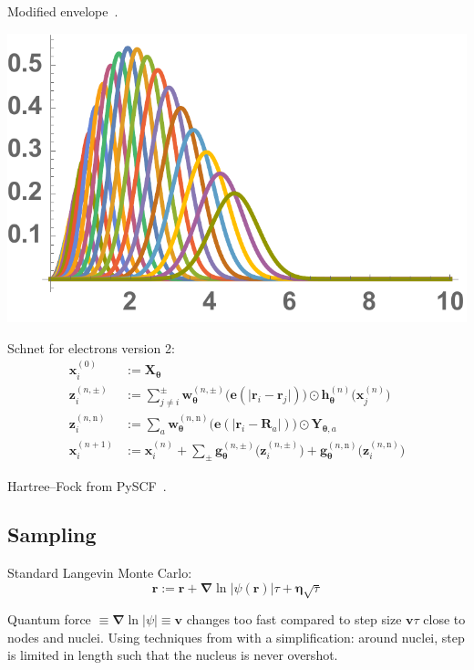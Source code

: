Modified envelope~\citep{UnkeAP19}.

\begin{center}
\includegraphics[width=0.6\linewidth]{figs/dist-features.pdf}
\end{center}

Schnet for electrons version 2:
\begin{equation}
\begin{aligned}
\mathbf x_i^{(0)}&:=\mathbf X_{\boldsymbol\theta} \\
\mathbf z_i^{(n,\pm)}&:=\sum\nolimits_{j\neq i}^\pm
  \mathbf w^{(n,\pm)}_{\boldsymbol\theta}
  \big(\mathbf e(\lvert\mathbf r_i-\mathbf r_j\rvert)\big)
  \odot\mathbf h_{\boldsymbol\theta}^{(n)}\big(\mathbf x_j^{(n)}\big) \\ 
\mathbf z_i^{(n,\mathrm n)}&:=\sum\nolimits_a
  \mathbf w_{\boldsymbol\theta}^{(n,\mathrm n)}
  \big(\mathbf e(\lvert\mathbf r_i-\mathbf R_a\rvert)\big)
  \odot\mathbf Y_{\boldsymbol\theta,a} \\
\mathbf x_i^{(n+1)}&:=\mathbf x_i^{(n)}
  +\sum\nolimits_\pm\mathbf g^{(n,\pm)}_{\boldsymbol\theta}
  \big(\mathbf z_i^{(n,\pm)}\big)
  +\mathbf g^{(n,\mathrm n)}_{\boldsymbol\theta}
  \big(\mathbf z_i^{(n,\mathrm n)}\big)
\end{aligned}
\end{equation}

Hartree--Fock from PySCF~\citep{SunWCMS18}.

\subsection{Sampling}

Standard Langevin Monte Carlo:
\begin{equation}
\mathbf r:=\mathbf r+\boldsymbol\nabla\ln\lvert\psi(\mathbf r)\rvert\tau+\boldsymbol\eta\sqrt\tau
\end{equation}

Quantum force $\equiv\boldsymbol\nabla\ln\lvert\psi\rvert\equiv\mathbf v$ changes too fast compared to step size $\mathbf v\tau$ close to nodes and nuclei.
Using techniques from \citet{UmrigarJCP93} with a simplification: around nuclei, step is limited in length such that the nucleus is never overshot.

